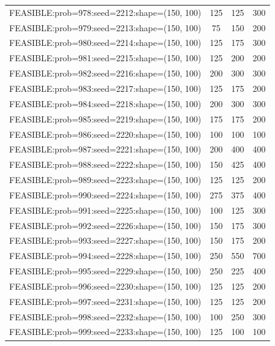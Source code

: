 \begin{longtable}{lccc}
FEASIBLE:prob=978:seed=2212:shape=(150, 100) &  125 &   125 &    300 \\
FEASIBLE:prob=979:seed=2213:shape=(150, 100) &   75 &   150 &    200 \\
FEASIBLE:prob=980:seed=2214:shape=(150, 100) &  125 &   175 &    300 \\
FEASIBLE:prob=981:seed=2215:shape=(150, 100) &  125 &   200 &    200 \\
FEASIBLE:prob=982:seed=2216:shape=(150, 100) &  200 &   300 &    300 \\
FEASIBLE:prob=983:seed=2217:shape=(150, 100) &  125 &   175 &    200 \\
FEASIBLE:prob=984:seed=2218:shape=(150, 100) &  200 &   300 &    300 \\
FEASIBLE:prob=985:seed=2219:shape=(150, 100) &  175 &   175 &    200 \\
FEASIBLE:prob=986:seed=2220:shape=(150, 100) &  100 &   100 &    100 \\
FEASIBLE:prob=987:seed=2221:shape=(150, 100) &  200 &   400 &    400 \\
FEASIBLE:prob=988:seed=2222:shape=(150, 100) &  150 &   425 &    400 \\
FEASIBLE:prob=989:seed=2223:shape=(150, 100) &  125 &   125 &    200 \\
FEASIBLE:prob=990:seed=2224:shape=(150, 100) &  275 &   375 &    400 \\
FEASIBLE:prob=991:seed=2225:shape=(150, 100) &  100 &   125 &    300 \\
FEASIBLE:prob=992:seed=2226:shape=(150, 100) &  150 &   175 &    300 \\
FEASIBLE:prob=993:seed=2227:shape=(150, 100) &  150 &   175 &    200 \\
FEASIBLE:prob=994:seed=2228:shape=(150, 100) &  250 &   550 &    700 \\
FEASIBLE:prob=995:seed=2229:shape=(150, 100) &  250 &   225 &    400 \\
FEASIBLE:prob=996:seed=2230:shape=(150, 100) &  125 &   125 &    200 \\
FEASIBLE:prob=997:seed=2231:shape=(150, 100) &  125 &   125 &    200 \\
FEASIBLE:prob=998:seed=2232:shape=(150, 100) &  100 &   250 &    300 \\
FEASIBLE:prob=999:seed=2233:shape=(150, 100) &  125 &   100 &    100 \\
\end{longtable}

